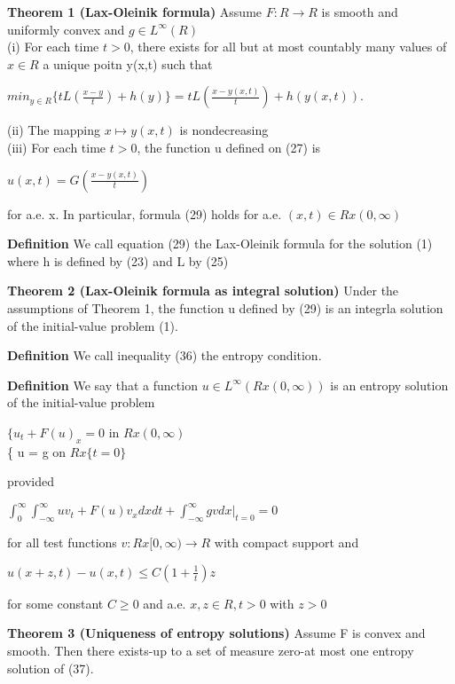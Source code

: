 \documentclass{article}
\newcommand\tab[1][1cm]{\hspace*{#1}}
\begin{document}
\textbf {Theorem 1 (Lax-Oleinik formula)} Assume $F: R \to R$ is smooth and uniformly convex and $g \in L^\infty (R)$ \\
\tab (i) For each time $t > 0$, there exists for all but at most countably many values of $x \in R$ a unique poitn y(x,t) such that 
\begin{center}
$min_{y \in R} \{ tL ( \frac{x-y}{t}) + h(y) \} = tL (\frac{x-y(x,t)}{t}) + h(y(x,t))$.
\end{center}
\tab (ii) The mapping $x \mapsto y(x,t)$ is nondecreasing \\
\tab (iii) For each time $t > 0$, the function u defined on (27) is 
\begin{center}
$u(x,t) = G(\frac{x-y(x,t)}{t})$
\end{center}
for a.e. x. In particular, formula (29) holds for a.e. $(x,t) \in R x (0, \infty)$

\textbf {Definition} We call equation (29) the Lax-Oleinik formula for the solution (1) where h is defined by (23) and L by (25)

\textbf {Theorem 2 (Lax-Oleinik formula as integral solution)} Under the assumptions of Theorem 1, the function u defined by (29) is an integrla solution of the initial-value problem (1).

\textbf {Definition} We call inequality (36) the entropy condition.

\textbf {Definition} We say that a function $u \in L^\infty (R x (0,\infty))$ is an entropy solution of the initial-value problem
\begin{center}
$\{ u_t + F(u)_x = 0$ \tab in $R x (0, \infty)$ \\
\{ \tab u = g \tab on $R x \{t =0\}$ 
\end{center}
provided
\begin{center}
$\int_0^\infty \int_{-\infty}^\infty uv_t + F(u)v_x dx dt + \int_{-\infty}^\infty gvdx|_{t=0} = 0$
\end{center}
for all test functions $v: R x [0, \infty) \to R$ with compact support and 
\begin{center}
$u(x + z, t) - u(x,t) \leq C(1 + \frac{1}{t})z$
\end{center}
for some constant $C \geq 0$ and a.e. $x, z \in R, t > 0$ with $z > 0$

\textbf {Theorem 3 (Uniqueness of entropy solutions)} Assume F is convex and smooth. Then there exists-up to a set of measure zero-at most one entropy solution of (37).
\end{document}
